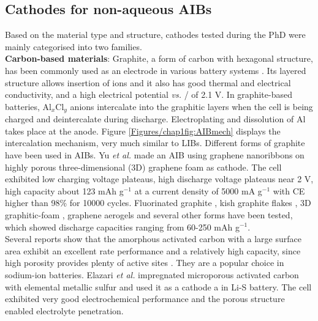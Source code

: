 \subsection{Cathodes for non-aqueous AIBs}
Based on the material type and structure, cathodes tested during the PhD were mainly categorised into two families.\\
\textbf{Carbon-based materials}: Graphite, a form of carbon with hexagonal structure, has been commonly used as an electrode in various battery systems \cite{xu_charge-transfer_2007,zhang_novel_2016,wu_carbon_2003,jian_carbon_2015}. Its layered structure allows insertion of ions and it also has good thermal and electrical conductivity, and a high electrical potential \textit{vs.} / of 2.1 V. In graphite-based batteries, Al$_x$Cl$_y$ anions intercalate into the graphitic layers when the cell is being charged and deintercalate during discharge. Electroplating and dissolution of Al takes place at the anode. Figure \ref{Figures/chap1fig:AIBmech} displays the intercalation mechanism, very much similar to LIBs. Different forms of graphite have been used in AIBs. Yu \textit{et al.} made an AIB using graphene nanoribbons on highly porous three-dimensional (3D) graphene foam as cathode. The cell exhibited low charging voltage plateaus, high discharge voltage plateaus near 2 V, high capacity about 123 mAh g$^{-1}$ at a current density of 5000 mA g$^{-1}$ with CE higher than 98\% for 10000 cycles\cite{yu_graphene_2017}. Fluorinated graphite \cite{rani_fluorinated_2013}, kish graphite flakes \cite{wang_kish_2017}, 3D graphitic-foam \cite{wu_3d_2016}, graphene aerogels\cite{huang_graphene_2019} and several other forms have been tested, which showed discharge capacities ranging from 60-250 mAh g$^{-1}$. \\
Several reports show that the amorphous activated carbon with a large surface area exhibit an excellent rate performance and a relatively high capacity, since high porosity provides plenty of active sites \cite{tang_hollow,li_commercial_2018}. They are a popular choice in sodium-ion batteries\cite{zhu_hi,hou_carb,cao_sod}. Elazari \textit{et al.} impregnated microporous activated carbon with elemental metallic sulfur and used it as a cathode a in Li-S battery. The cell exhibited very good electrochemical performance and the porous structure enabled electrolyte penetration.  


